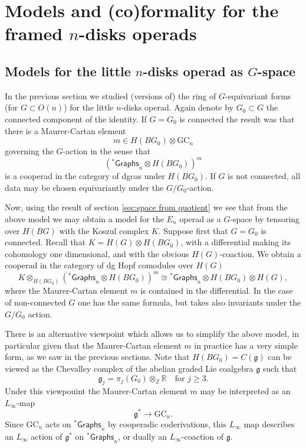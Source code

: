 \documentclass[a4paper]{amsart}
\theoremstyle{plain}
\theoremstyle{definition}
\newcommand{\alg}[1]{\mathfrak{{#1}}}
\newcommand{\R}{{\mathbb{R}}}
\newcommand{\Z}{{\mathbb{Z}}}
\newcommand{\Graphs}{{\mathsf{Graphs}}}
\newcommand{\GC}{\mathrm{GC}}
\newcommand{\stG}{{}^*\Graphs}
\begin{document}
\section{Models and (co)formality for the framed \texorpdfstring{$n$}{n}-disks operads}\label{sec:framed}

\subsection{Models for the little \texorpdfstring{$n$}{n}-disks operad as \texorpdfstring{$G$}{G}-space}
In the previous section we studied (versions of) the ring of $G$-equivariant forms (for $G\subset O(n)$) for the little $n$-disks operad.
Again denote by $G_0\subset G$ the connected component of the identity.
If $G=G_0$ is connected the result was that there is a Maurer-Cartan element 
\[
 m\in H(BG_0)\otimes \GC_n
\]
governing the $G$-action in the sense that 
\[
 (\stG_n\otimes H(BG_0))^m
\]
is a cooperad in the category of dgcas under $H(BG_0)$.
If $G$ is not connected, all data may be chosen equivariantly under the $G/G_0$-action.

Now, using the result of section \ref{sec:space from quotient} we see that from the above model we may obtain a model for the $E_n$ operad as a $G$-space by tensoring over $H(BG)$ with the Koszul complex $K$. 
Suppose first that $G=G_0$ is connected. Recall that $K=H(G)\otimes H(BG_0)$, with a differential making its cohomology one dimensional, and with the obvious $H(G)$-coaction.
We obtain a cooperad in the category of dg Hopf comodules over $H(G)$
\[
 K\otimes_{H(BG_0)} (\stG_n\otimes H(BG_0))^m \cong \stG_n\otimes H(BG_0) \otimes H(G),
\]
where the Maurer-Cartan element $m$ is contained in the differential. In the case of non-connected $G$ one has the same formula, but takes also invariants under the $G/G_0$ action.

There is an alternative viewpoint which allows us to simplify the above model, in particular given that the Maurer-Cartan element $m$ in practice has a very simple form, as we saw in the previous sections.
Note that $H(BG_0)=C(\alg g)$ can be viewed as the Chevalley complex of the abelian graded Lie coalgebra $\alg g$ such that
\[
 \alg g_j = \pi_j(G_0)\otimes_{\Z} \R \quad\text{for $j\geq 3$}.
\]
Under this viewpouint the Maurer-Cartan element $m$ may be interpreted as an $L_\infty$-map 
\[
 \alg g^* \to \GC_n.
\]
Since $\GC_n$ acts on $\stG_n$ by cooperadic coderivations, this $L_\infty$ map describes an $L_\infty$ action of $\alg g^*$ on $\stG_n$, or dually an $L_\infty$-coaction of $\alg g$.
\end{document}
